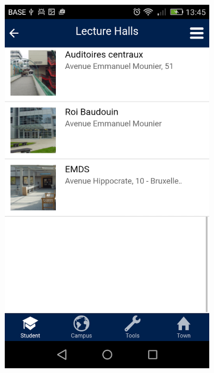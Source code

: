 \documentclass{eplmastersthesis}
\begin{document}
\begin{figure}
    \centering
\begin{subfigure}[b]{0.3\textwidth}
        \includegraphics[width=\textwidth]{Images/Application_screens/Screenshot_2016-06-06-13-45-20.png}
    \end{subfigure}
    ~ %
    \begin{subfigure}[b]{0.3\textwidth}

\end{subfigure}
\end{figure}
\end{document}
